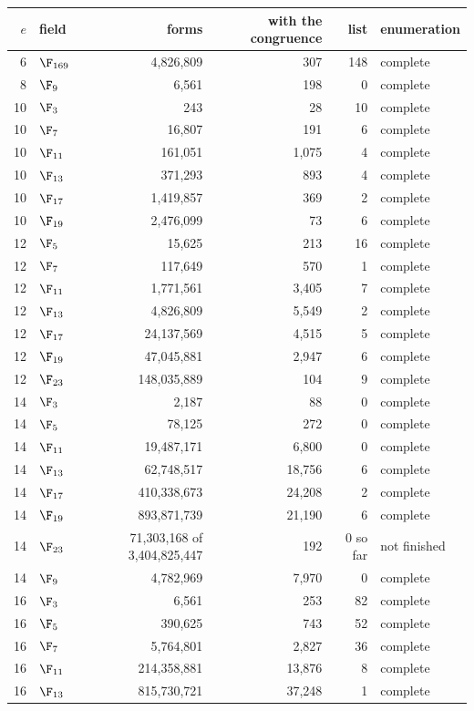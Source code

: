 \begin{tabular}{@{}rlrrrl@{}}
\toprule
$e$ & field & forms & with the congruence & list & enumeration\\
\midrule
6 & $\F_{169}$ & 4{,}826{,}809 & 307 & 148 & complete\\
8 & $\F_{9}$ & 6{,}561 & 198 & 0 & complete\\
10 & $\F_{3}$ & 243 & 28 & 10 & complete\\
10 & $\F_{7}$ & 16{,}807 & 191 & 6 & complete\\
10 & $\F_{11}$ & 161{,}051 & 1{,}075 & 4 & complete\\
10 & $\F_{13}$ & 371{,}293 & 893 & 4 & complete\\
10 & $\F_{17}$ & 1{,}419{,}857 & 369 & 2 & complete\\
10 & $\F_{19}$ & 2{,}476{,}099 & 73 & 6 & complete\\
12 & $\F_{5}$ & 15{,}625 & 213 & 16 & complete\\
12 & $\F_{7}$ & 117{,}649 & 570 & 1 & complete\\
12 & $\F_{11}$ & 1{,}771{,}561 & 3{,}405 & 7 & complete\\
12 & $\F_{13}$ & 4{,}826{,}809 & 5{,}549 & 2 & complete\\
12 & $\F_{17}$ & 24{,}137{,}569 & 4{,}515 & 5 & complete\\
12 & $\F_{19}$ & 47{,}045{,}881 & 2{,}947 & 6 & complete\\
12 & $\F_{23}$ & 148{,}035{,}889 & 104 & 9 & complete\\
14 & $\F_{3}$ & 2{,}187 & 88 & 0 & complete\\
14 & $\F_{5}$ & 78{,}125 & 272 & 0 & complete\\
14 & $\F_{11}$ & 19{,}487{,}171 & 6{,}800 & 0 & complete\\
14 & $\F_{13}$ & 62{,}748{,}517 & 18{,}756 & 6 & complete\\
14 & $\F_{17}$ & 410{,}338{,}673 & 24{,}208 & 2 & complete\\
14 & $\F_{19}$ & 893{,}871{,}739 & 21{,}190 & 6 & complete\\
14 & $\F_{23}$ & 71{,}303{,}168 of 3{,}404{,}825{,}447 & 192 & 0 so far & not finished\\
14 & $\F_{9}$ & 4{,}782{,}969 & 7{,}970 & 0 & complete\\
16 & $\F_{3}$ & 6{,}561 & 253 & 82 & complete\\
16 & $\F_{5}$ & 390{,}625 & 743 & 52 & complete\\
16 & $\F_{7}$ & 5{,}764{,}801 & 2{,}827 & 36 & complete\\
16 & $\F_{11}$ & 214{,}358{,}881 & 13{,}876 & 8 & complete\\
16 & $\F_{13}$ & 815{,}730{,}721 & 37{,}248 & 1 & complete\\
\bottomrule
\end{tabular}
